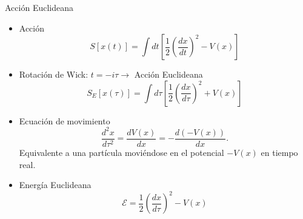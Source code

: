 \documentclass{beamer}
\theoremstyle{example}
\theoremstyle{example}
\begin{document}
\begin{frame}{Acción Euclideana}
\begin{itemize}
    \item Acción
    \begin{equation}
        S[x(t)] =  \int dt \left[ \frac{1}{2}\left(\frac{dx}{dt}\right)^2 - V(x) \right] 
    \end{equation}
    
    \item Rotación de Wick: $t = - i\tau \rightarrow$ Acción Euclideana
    \begin{equation}\label{eucliaction}
        S_E[x(\tau)] = \int d\tau \left[ \frac{1}{2}\left(\frac{dx}{d\tau}\right)^2 + V(x) \right] 
    \end{equation}
    
    \item Ecuación de movimiento
    \begin{equation}\label{eq:mov}
        \frac{d^2 x}{d\tau^2} = \frac{dV(x)}{dx} = -\frac{d(-V(x))}{dx}.
    \end{equation}
    Equivalente a una partícula moviéndose en el potencial $-V(x)$ en tiempo real. 
    
    \item Energía Euclideana
    \begin{equation}
        \mathcal{E} =  \frac{1}{2}\left(\frac{dx}{d\tau}\right)^2 - V(x)
    \end{equation}
\end{itemize}
\end{frame}
\end{document}
